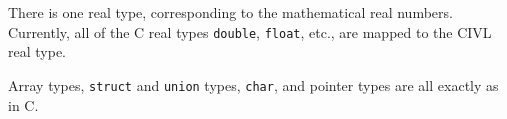 There is one real type, corresponding to the mathematical real
numbers. Currently, all of the C real types \texttt{double},
\texttt{float}, etc., are mapped to the CIVL real type.

Array types, \texttt{struct} and \texttt{union} types, \texttt{char},
and pointer types are all exactly as in C.








